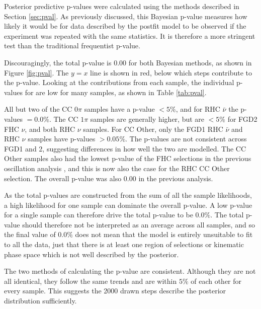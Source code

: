 Posterior predictive p-values were calculated using the methods described in Section \ref{sec:pval}. As previously discussed, this Bayesian p-value measures how likely it would be for data described by the postfit model to be observed if the experiment was repeated with the same statistics. It is therefore a more stringent test than the traditional frequentist p-value.

Discouragingly, the total p-value is 0.00 for both Bayesian methods, as shown in Figure \ref{fig:pval}. The $y=x$ line is shown in red, below which steps contribute to the p-value. Looking at the contributions from each sample, the individual p-values for are low for many samples, as shown in Table \ref{tab:pval}. 

All but two of the CC 0$\pi$ samples have a p-value $<5\%$, and for RHC $\bar{\nu}$ the p-values $=0.0\%$. The CC $1\pi$ samples are generally higher, but are $<5\%$ for FGD2 FHC $\nu$, and both RHC $\nu$ samples. For CC Other, only the FGD1 RHC $\bar{\nu}$ and RHC $\nu$ samples have p-values $>0.05\%$. The p-values are not consistent across FGD1 and 2, suggesting differences in how well the two are modelled. The CC Other samples also had the lowest p-value of the FHC selections in the previous oscillation analysis \cite{tn324}, and this is now also the case for the RHC CC Other selection. The overall p-value was also 0.00 in the previous analysis.

As the total p-values are constructed from the sum of all the sample likelihoods, a high likelihood for one sample can dominate the overall p-value. A low p-value for a single sample can therefore drive the total p-value to be 0.0$\%$. The total p-value should therefore not be interpreted as an average across all samples, and so the final value of 0.0$\%$ does not mean that the model is entirely unsuitable to fit to all the data, just that there is at least one region of selections or kinematic phase space which is not well described by the posterior.

The two methods of calculating the p-value are consistent. Although they are not all identical, they follow the same trends and are within $5\%$ of each other for every sample. This suggests the 2000 drawn steps describe the posterior distribution sufficiently.

